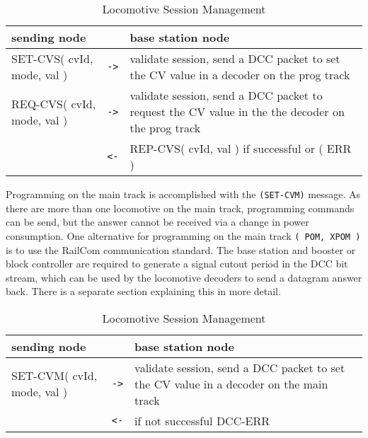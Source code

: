 \begin{table}[ht!]
    \begin{center}
        \caption{Locomotive Session Management}
        \begin{tabular}{|p{}| c |p{}|}
            \toprule
            \textbf{sending node} & & \textbf{ base station node} \\
            \midrule
            SET-CVS( cvId, mode, val ) & \texttt{->} & validate session, send a DCC packet to set the CV value in a decoder on the prog track \\
            \midrule
            REQ-CVS( cvId, mode, val ) & \texttt{->} & validate session, send a DCC packet to request the CV value in the the decoder on the prog track \\
            & \texttt{<-} & REP-CVS( cvId, val ) if successful or ( ERR ) \\ 
            \bottomrule
        \end{tabular}
    \end{center}
\end{table}

Programming on the main track is accomplished with the \texttt{(SET-CVM)} message. As there are more than one locomotive on the main track, programming commands can be send, but the answer cannot be received via a change in power consumption. One alternative for programming on the main track \texttt{( POM, XPOM )} is to use the RailCom communication standard. The base station and booster or block controller are required to generate a signal cutout period in the DCC bit stream, which can be used by the locomotive decoders to send a datagram answer back. There is a separate section explaining this in more detail.

\begin{table}[ht!]
    \begin{center}
        \caption{Locomotive Session Management}
        \begin{tabular}{|p{}| c |p{}|}
            \toprule
            \textbf{sending node} & & \textbf{ base station node} \\
            \midrule
            SET-CVM( cvId, mode, val ) & \texttt{->} & validate session, send a DCC packet to set the CV value in a decoder on the main track \\
            & \texttt{<-} & if not successful DCC-ERR \\
            \bottomrule
        \end{tabular}
    \end{center}
\end{table}

